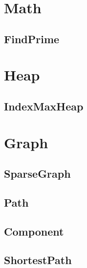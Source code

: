 \section{Math}
    \subsection{FindPrime}
        

\section{Heap}
    \subsection{IndexMaxHeap}
        

\section{Graph}
    \subsection{SparseGraph}
        
    \subsection{Path}
        
    \subsection{Component}
        
    \subsection{ShortestPath}
        